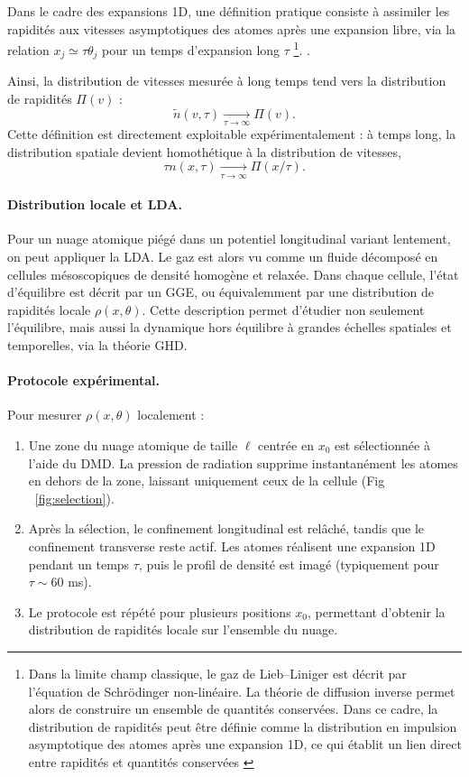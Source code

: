 Dans le cadre des expansions 1D, une définition pratique consiste à assimiler les rapidités aux vitesses asymptotiques des atomes après une expansion libre, via la relation \(x_j \simeq \tau \theta_j\) pour un temps d’expansion long \(\tau\) \footnote{Dans la limite champ classique, le gaz de Lieb–Liniger est décrit par l’équation de Schrödinger non-linéaire. La théorie de diffusion inverse permet alors de construire un ensemble de quantités conservées. Dans ce cadre, la distribution de rapidités peut être définie comme la distribution en impulsion asymptotique des atomes après une expansion 1D, ce qui établit un lien direct entre rapidités et quantités conservées \cite{bezzaz2023rapiditydistributiondefocusingnonlinear}}.
.  

Ainsi, la distribution de vitesses mesurée à long temps tend vers la distribution de rapidités \(\Pi(v)\) :  
\[
	\tilde{n}(v , \tau ) \underset{\tau \to \infty}{\longrightarrow} \Pi(v).
\]  
Cette définition est directement exploitable expérimentalement : à temps long, la distribution spatiale devient homothétique à la distribution de vitesses,  
\[
	\tau n(x , \tau ) \underset{\tau \to \infty}{\longrightarrow} \Pi(x/\tau).
\] 


\paragraph{Distribution locale et LDA.}  
Pour un nuage atomique piégé dans un potentiel longitudinal variant lentement, on peut appliquer la \gls{LDA}. Le gaz est alors vu comme un fluide décomposé en cellules mésoscopiques de densité homogène et relaxée. Dans chaque cellule, l’état d’équilibre est décrit par un \gls{GGE}, ou équivalemment par une distribution de rapidités locale \(\rho(x,\theta)\). Cette description permet d’étudier non seulement l’équilibre, mais aussi la dynamique hors équilibre à grandes échelles spatiales et temporelles, via la théorie \gls{GHD}.

\paragraph{Protocole expérimental.}  
Pour mesurer \(\rho(x,\theta)\) localement :  
\begin{enumerate}
    \item Une zone du nuage atomique de taille \(\ell\) centrée en \(x_0\) est sélectionnée à l’aide du \gls{DMD}. La pression de radiation supprime instantanément les atomes en dehors de la zone, laissant uniquement ceux de la cellule (Fig ~\ref{fig:selection}).
    \item Après la sélection, le confinement longitudinal est relâché, tandis que le confinement transverse reste actif. Les atomes réalisent une expansion 1D pendant un temps \(\tau\), puis le profil de densité est imagé (typiquement pour \(\tau\sim 60\) ms).
    \item Le protocole est répété pour plusieurs positions \(x_0\), permettant d’obtenir la distribution de rapidités locale sur l’ensemble du nuage.
\end{enumerate}


